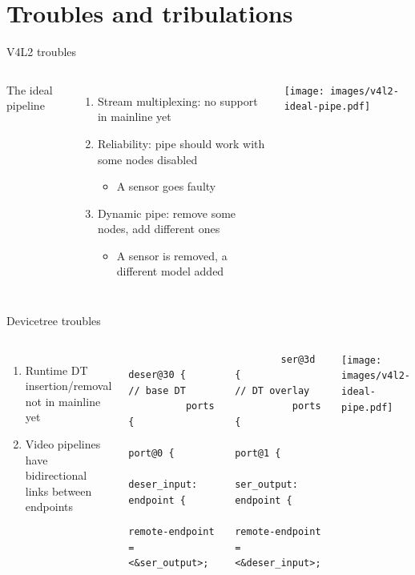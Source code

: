 \documentclass[xetex,table,aspectratio=169]{beamer}
\begin{document}
\section{Troubles and tribulations}

\begin{frame}{V4L2 troubles}
  \begin{columns}
    \begin{flushright}
      The ideal pipeline \textrightarrow
    \end{flushright}

    \vspace{0.2\textheight}

    \begin{enumerate}
    \item Stream multiplexing: no support in mainline yet
    \item Reliability: pipe should work with some nodes disabled
      \begin{itemize}
      \item A sensor goes faulty
      \end{itemize}
    \item Dynamic pipe: remove some nodes, add different ones
      \begin{itemize}
      \item A sensor is removed, a different model added
      \end{itemize}
    \end{enumerate}

    \center\texttt{[image: images/v4l2-ideal-pipe.pdf]}
  \end{columns}
\end{frame}

\begin{frame}[fragile]{Devicetree troubles}
  \begin{columns}
    \begin{enumerate}
    \item Runtime DT insertion/removal not in mainline yet
    \item Video pipelines have bidirectional links between endpoints
    \end{enumerate}

    \begin{verbatim}
        deser@30 {                               // base DT
          ports {
            port@0 {
              deser_input: endpoint {
                remote-endpoint = <&ser_output>;
    \end{verbatim}

    \begin{verbatim}
        ser@3d {                              // DT overlay
          ports {
            port@1 {
              ser_output: endpoint {
                remote-endpoint = <&deser_input>;
    \end{verbatim}

    \center\texttt{[image: images/v4l2-ideal-pipe.pdf]}
  \end{columns}
\end{frame}
\end{document}
